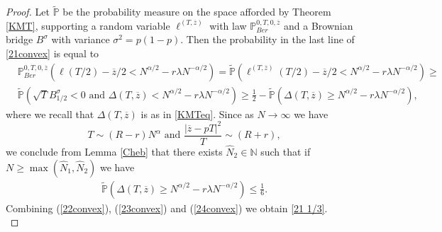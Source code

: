 \begin{proof}
	Let $\tilde{\mathbb{P}}$ be the probability measure on the space afforded by Theorem \ref{KMT}, supporting a random variable $\ell^{(T,\overline{z})}$ with law $\mathbb{P}^{0,T,0,\overline{z}}_{Ber}$ and a Brownian bridge $B^\sigma$ with variance $\sigma^2 = p(1-p)$. Then the probability in the last line of \eqref{21convex} is equal to
	\begin{equation} \label{23convex}
		\begin{split}
			&\mathbb{P}^{0,T,0,\overline{z}}_{Ber}\left(\ell(T/2) - \overline{z}/2 < N^{\alpha/2} -  r\lambda N^{-\alpha/2} \right) = \tilde{\mathbb{P}} \left( \ell^{(T,\overline{z})}(T/2) - \overline{z}/2 <N^{\alpha/2} -  r\lambda N^{-\alpha/2}    \right) \geq \\
			& \tilde{\mathbb{P}} \left( \sqrt{T}B^\sigma_{1/2} < 0 \mbox{ and }\Delta(T,\overline{z}) <N^{\alpha/2} -  r\lambda N^{-\alpha/2}     \right) \geq \frac{1}{2} - \tilde{\mathbb{P}} \left( \Delta(T,\overline{z}) \geq N^{\alpha/2} -  r\lambda N^{-\alpha/2} \right),
		\end{split}
	\end{equation}
	where we recall that $\Delta(T,\overline{z})$ is as in \eqref{KMTeq}. Since as $N \rightarrow \infty$ we have 
	\begin{equation*}
		T \sim (R-r) N^{\alpha} \mbox{ and }\frac{|\overline{z} - pT|^2}{T} \sim (R+r),
	\end{equation*}
	we conclude from Lemma \ref{Cheb} that there exists $\hat{N}_2 \in \mathbb{N}$ such that if $N \geq \max(\hat{N}_1, \hat{N}_2)$ we have
	\begin{equation} \label{24convex}
		\begin{split}
			\tilde{\mathbb{P}} \left( \Delta(T,\overline{z}) \geq N^{\alpha/2} -  r\lambda N^{-\alpha/2} \right) \leq \frac{1}{6}.
		\end{split}
	\end{equation}
	Combining (\ref{22convex}), (\ref{23convex}) and (\ref{24convex}) we obtain \eqref{21 1/3}. \\
	

\end{proof}
